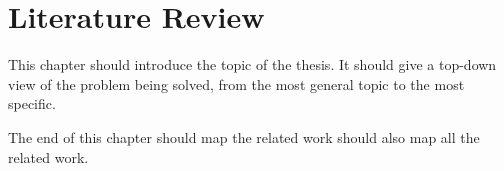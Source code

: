 \chapter{Literature Review}

This chapter should introduce the topic of the thesis. It should give a top-down view of the problem being solved, from the most general topic to the most specific.

The end of this chapter should map the related work should also map all the related work.

